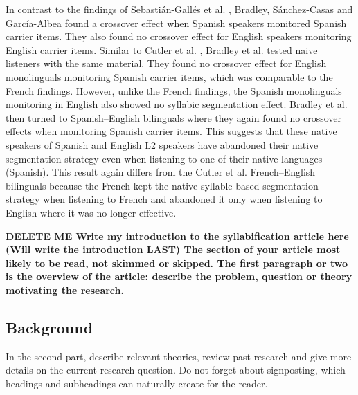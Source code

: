 In contrast to the findings of Sebastián-Gallés et al. \parencite*{Sebastian-Galles1992-xd} , Bradley, Sánchez-Casas and García-Albea \parencite*{Bradley1993-qq}  found a crossover effect when Spanish speakers monitored Spanish carrier items. They also found no crossover effect for English speakers monitoring English carrier items. Similar to Cutler et al. \parencite*{Cutler1986-zl}, Bradley et al. \parencite*{Bradley1993-qq}  tested naive listeners with the same material. They found no crossover effect for English monolinguals monitoring Spanish carrier items, which was comparable to the French findings. However, unlike the French findings, the Spanish monolinguals monitoring in English also showed no syllabic segmentation effect. Bradley et al. \parencite*{Bradley1993-qq} then turned to Spanish–English bilinguals where they again found no crossover effects when monitoring Spanish carrier items. This suggests that these native speakers of Spanish and English L2 speakers have abandoned their native segmentation strategy even when listening to one of their native languages (Spanish). This result again differs from the Cutler et al. \parencite*{Cutler1986-zl} French–English bilinguals because the French kept the native syllable-based segmentation strategy when listening to French and abandoned it only when listening to English where it was no longer effective.


\textbf{DELETE ME Write my introduction to the syllabification article here (Will write the introduction LAST)
The section of your article most likely to be read, not skimmed or skipped. The first paragraph or two is the overview of the article: describe the problem, question or theory motivating the research.} 

\subsection{Background}

In the second part, describe relevant theories, review past research and give more details on the current research question. Do not forget about signposting, which headings and subheadings can naturally create for the reader.


